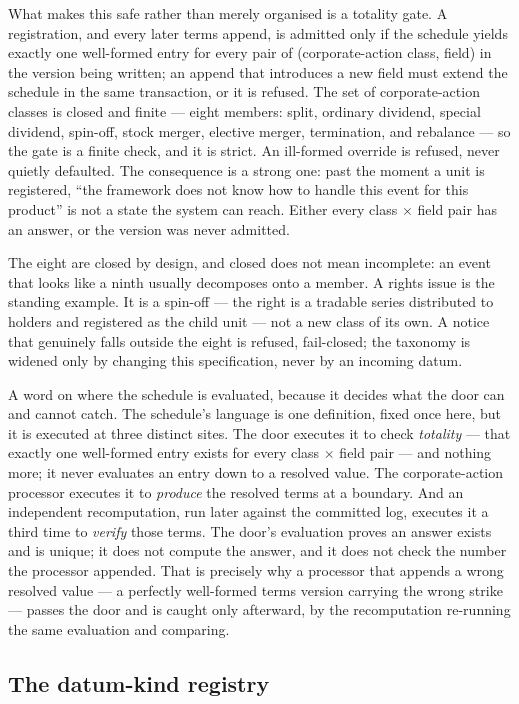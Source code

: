 What makes this safe rather than merely organised is a totality gate. A
registration, and every later terms append, is admitted only if the schedule
yields exactly one well-formed entry for every pair of (corporate-action class,
field) in the version being written; an append that introduces a new field must
extend the schedule in the same transaction, or it is refused. The set of
corporate-action classes is closed and finite --- eight members: split, ordinary
dividend, special dividend, spin-off, stock merger, elective merger, termination,
and rebalance --- so the gate is a finite check, and it is strict. An ill-formed
override is refused, never quietly defaulted. The consequence is a strong one:
past the moment a unit is registered, ``the framework does not know how to handle
this event for this product'' is not a state the system can reach. Either every
class $\times$ field pair has an answer, or the version was never admitted.

The eight are closed by design, and closed does not mean incomplete: an event that
looks like a ninth usually decomposes onto a member. A rights issue is the standing
example. It is a spin-off --- the right is a tradable series distributed to holders
and registered as the child unit --- not a new class of its own. A notice that
genuinely falls outside the eight is refused, fail-closed; the taxonomy is widened
only by changing this specification, never by an incoming datum.

A word on where the schedule is evaluated, because it decides what the door can and
cannot catch. The schedule's language is one definition, fixed once here, but it is
executed at three distinct sites. The door executes it to check \emph{totality} ---
that exactly one well-formed entry exists for every class $\times$ field pair --- and
nothing more; it never evaluates an entry down to a resolved value. The
corporate-action processor executes it to \emph{produce} the resolved terms at a
boundary. And an independent recomputation, run later against the committed log,
executes it a third time to \emph{verify} those terms. The door's evaluation proves
an answer exists and is unique; it does not compute the answer, and it does not
check the number the processor appended. That is precisely why a processor that
appends a wrong resolved value --- a perfectly well-formed terms version carrying
the wrong strike --- passes the door and is caught only afterward, by the
recomputation re-running the same evaluation and comparing.

\subsection{The datum-kind registry}

